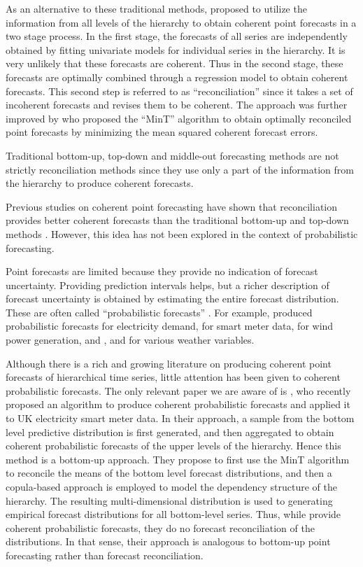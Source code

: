 \documentclass[a4paper, 11pt]{article}
\begin{document}
As an alternative to these traditional methods, \citet{Hyndman2011} proposed to utilize the information from all levels of the hierarchy to obtain coherent point forecasts in  a two stage process. In the first stage, the forecasts of all series are independently obtained by fitting univariate models for individual series in the hierarchy. It is very unlikely that these forecasts are coherent. Thus in the second stage, these forecasts are optimally combined through a regression model to obtain coherent forecasts. This second step is referred to as ``reconciliation'' since it takes a set of incoherent forecasts and revises them to be coherent. The approach was further improved by \citet{Wickramasuriya2017} who proposed the ``MinT'' algorithm to obtain optimally reconciled point forecasts by minimizing the mean squared coherent forecast errors. 

Traditional bottom-up, top-down and middle-out forecasting methods are not strictly reconciliation methods since they use only a part of the information from the hierarchy to produce coherent forecasts. 

Previous studies on coherent point forecasting have shown that reconciliation provides better coherent forecasts than the traditional bottom-up and top-down methods \citep{Hyndman2011,VanErven2015a,Wickramasuriya2017}. However, this idea has not been explored in the context of probabilistic forecasting. 

Point forecasts are limited because they provide no indication of forecast uncertainty. Providing prediction intervals helps, but a richer description of forecast uncertainty is obtained by estimating the entire forecast distribution. These are often called ``probabilistic forecasts'' \citep{Gneiting2014}. For example, \citet{McSharry2005} produced probabilistic forecasts for electricity demand, \citet{BenTaieb2017} for smart meter data, \citet{Pinson2009} for wind power generation, and \citet{Gel2004}, \citet{Gneiting2005a} and \citet{Gneiting2005} for various weather variables.

Although there is a rich and growing literature on producing coherent point forecasts of hierarchical time series, little  attention has been given to coherent probabilistic forecasts. The only relevant paper we are aware of is \citet{BenTaieb2017}, who recently proposed an algorithm to produce coherent probabilistic forecasts and applied it to UK electricity smart meter data. In their approach, a sample from the bottom level predictive distribution is first generated, and then aggregated to obtain coherent probabilistic forecasts of the upper levels of the hierarchy. Hence this method is a bottom-up approach. They propose to first use the MinT algorithm to reconcile the means of the bottom level forecast distributions, and then a copula-based approach is employed to model the dependency structure of the hierarchy. The resulting multi-dimensional distribution is used to generating empirical forecast distributions for all bottom-level series. Thus, while \citet{BenTaieb2017} provide coherent probabilistic forecasts, they do no forecast reconciliation of the distributions. In that sense, their approach is analogous to bottom-up point forecasting rather than forecast reconciliation.
\end{document}
